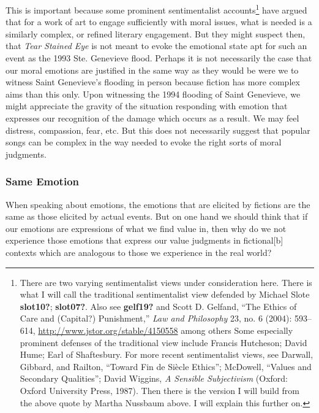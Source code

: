 \documentclass[
  12pt,
]{book}
\theoremstyle{definition}
\theoremstyle{definition}
\theoremstyle{definition}
\theoremstyle{definition}
\theoremstyle{remark}
\begin{document}
This is important because some prominent sentimentalist accounts\footnote{There are two varying sentimentalist views under consideration here. There is what I will call the traditional sentimentalist view defended by Michael Slote \textbf{slot10?}; \textbf{slot07?}. Also see \textbf{gelf19?} and Scott D. Gelfand, {``The {Ethics} of {Care} and ({Capital}?) {Punishment},''} \emph{Law and Philosophy} 23, no. 6 (2004): 593--614, \url{http://www.jstor.org/stable/4150558} among others Some especially prominent defenses of the traditional view include Francis Hutcheson; David Hume; Earl of Shaftesbury. For more recent sentimentalist views, see Darwall, Gibbard, and Railton, {``Toward Fin de Siècle Ethics''}; McDowell, {``Values and {Secondary Qualities}''}; David Wiggins, \emph{A Sensible Subjectivism} (Oxford: Oxford University Press, 1987). Then there is the version I will build from the above quote by Martha Nussbaum above. I will explain this further on.} have argued that for a work of art to engage sufficiently with moral issues, what is needed is a similarly complex, or refined literary engagement. But they might suspect then, that \emph{Tear Stained Eye} is not meant to evoke the emotional state apt for such an event as the 1993 Ste. Genevieve flood. Perhaps it is not necessarily the case that our moral emotions are justified in the same way as they would be were we to witness Saint Genevieve's flooding in person because fiction has more complex aims than this only. Upon witnessing the 1994 flooding of Saint Genevieve, we might appreciate the gravity of the situation responding with emotion that expresses our recognition of the damage which occurs as a result. We may feel distress, compassion, fear, etc. But this does not necessarily suggest that popular songs can be complex in the way needed to evoke the right sorts of moral judgments.

\subsubsection*{Same Emotion}\label{same-emotion}

When speaking about emotions, the emotions that are elicited by fictions are the same as those elicited by actual events. But on one hand we should think that if our emotions are expressions of what we find value in, then why do we not experience those emotions that express our value judgments in fictional{[}b{]} contexts which are analogous to those we experience in the real world?
\end{document}
